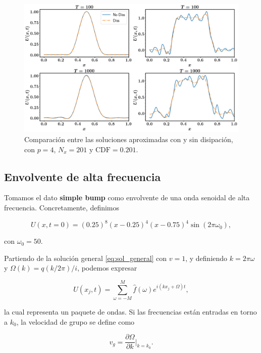 \documentclass[12pt]{article}
\begin{document}
\begin{figure}
\center
\includegraphics[scale=0.3]{diss.png}
\caption{Comparaci\'on entre las soluciones aproximadas con y sin disipaci\'on, con $p=4$, $N_x=201$ y $\mathrm{CDF} = 0.201$.} \label{fig:diss}
\end{figure}

\subsection{Envolvente de alta frecuencia}

Tomamos el dato \textbf{simple bump} como envolvente de una onda senoidal de alta frecuencia. Concretamente, definimos 

\begin{equation}
U(x, t=0) = (0.25)^{8}(x - 0.25)^4 (x - 0.75)^4 \sin(2\pi \omega_{0}),
\end{equation}

con $\omega_0 = 50$.

Partiendo de la soluci\'on general \ref{eq:sol_general} con $v=1$, y definiendo $k=2\pi \omega$ y $\Omega(k) = q(k/2\pi)/i$, podemos expresar

\begin{equation} \label{eq:paquete}
U(x_j, t) = \sum_{\omega=-M}^M \hat{f}(\omega)  e^{i(k x_j + \Omega) t},
\end{equation}

la cual representa un paquete de ondas. Si las frecuencias est\'an entradas en torno a $k_0$, la velocidad de grupo se define como 

\begin{equation}
v_g = \dfrac{\partial \Omega}{\partial k}\bigg|_{k=k_0}.
\end{equation}
\end{document}
